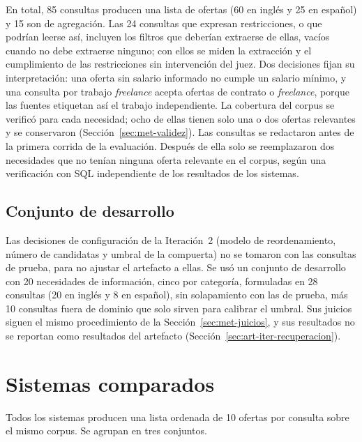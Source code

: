 En total, 85 consultas producen una lista de ofertas (60 en inglés y 25 en español) y 15 son de agregación. Las 24 consultas que expresan restricciones, o que podrían leerse así, incluyen los filtros que deberían extraerse de ellas, vacíos cuando no debe extraerse ninguno; con ellos se miden la extracción y el cumplimiento de las restricciones sin intervención del juez. Dos decisiones fijan su interpretación: una oferta sin salario informado no cumple un salario mínimo, y una consulta por trabajo \textit{freelance} acepta ofertas de contrato o \textit{freelance}, porque las fuentes etiquetan así el trabajo independiente. La cobertura del corpus se verificó para cada necesidad; ocho de ellas tienen solo una o dos ofertas relevantes y se conservaron (Sección~\ref{sec:met-validez}). Las consultas se redactaron antes de la primera corrida de la evaluación. Después de ella solo se reemplazaron dos necesidades que no tenían ninguna oferta relevante en el corpus, según una verificación con SQL independiente de los resultados de los sistemas.

\subsection{Conjunto de desarrollo}

Las decisiones de configuración de la Iteración~2 (modelo de reordenamiento, número de candidatas y umbral de la compuerta) no se tomaron con las consultas de prueba, para no ajustar el artefacto a ellas. Se usó un conjunto de desarrollo con 20 necesidades de información, cinco por categoría, formuladas en 28 consultas (20 en inglés y 8 en español), sin solapamiento con las de prueba, más 10 consultas fuera de dominio que solo sirven para calibrar el umbral. Sus juicios siguen el mismo procedimiento de la Sección~\ref{sec:met-juicios}, y sus resultados no se reportan como resultados del artefacto (Sección~\ref{sec:art-iter-recuperacion}).

\section{Sistemas comparados}
\label{sec:met-sistemas}

Todos los sistemas producen una lista ordenada de 10 ofertas por consulta sobre el mismo corpus. Se agrupan en tres conjuntos.

